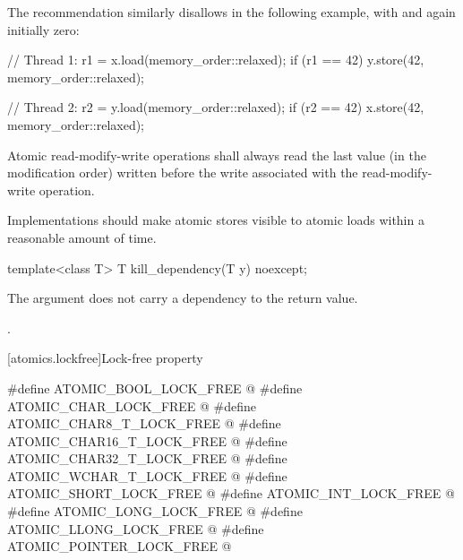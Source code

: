 \pnum
\begin{note}
The recommendation similarly disallows  in the
following example, with  and  again initially zero:

\begin{codeblock}
// Thread 1:
r1 = x.load(memory_order::relaxed);
if (r1 == 42) y.store(42, memory_order::relaxed);
\end{codeblock}

\begin{codeblock}
// Thread 2:
r2 = y.load(memory_order::relaxed);
if (r2 == 42) x.store(42, memory_order::relaxed);
\end{codeblock}
\end{note}

\pnum
Atomic read-modify-write operations shall always read the last value
(in the modification order) written before the write associated with
the read-modify-write operation.

\pnum
Implementations should make atomic stores visible to atomic loads within a reasonable
amount of time.

%
\begin{itemdecl}
template<class T>
  T kill_dependency(T y) noexcept;
\end{itemdecl}

\begin{itemdescr}
\pnum
\effects
The argument does not carry a dependency to the return
value.

\pnum
\returns
{}.
\end{itemdescr}


[atomics.lockfree]{Lock-free property}

%
%
%
%
%
%
%
%
%
%
%
\begin{codeblock}
#define ATOMIC_BOOL_LOCK_FREE @\unspec@
#define ATOMIC_CHAR_LOCK_FREE @\unspec@
#define ATOMIC_CHAR8_T_LOCK_FREE @\unspec@
#define ATOMIC_CHAR16_T_LOCK_FREE @\unspec@
#define ATOMIC_CHAR32_T_LOCK_FREE @\unspec@
#define ATOMIC_WCHAR_T_LOCK_FREE @\unspec@
#define ATOMIC_SHORT_LOCK_FREE @\unspec@
#define ATOMIC_INT_LOCK_FREE @\unspec@
#define ATOMIC_LONG_LOCK_FREE @\unspec@
#define ATOMIC_LLONG_LOCK_FREE @\unspec@
#define ATOMIC_POINTER_LOCK_FREE @\unspec@
\end{codeblock}


